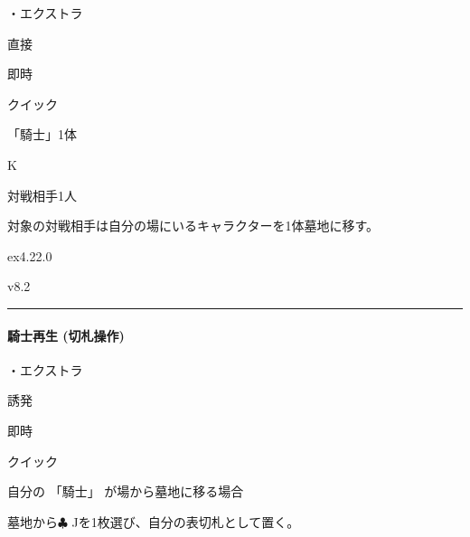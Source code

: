 \documentclass[letterpaper,10pt,dvipdfmx]{sphinxmanual}
\begin{document}
\sphinxAtStartPar
・エクストラ

\sphinxAtStartPar
{} 直接

\sphinxAtStartPar
{} 即時

\sphinxAtStartPar
{} クイック

\sphinxAtStartPar
{} 「騎士」1体

\sphinxAtStartPar
{} K

\sphinxAtStartPar
{}

\sphinxAtStartPar
対戦相手1人

\sphinxAtStartPar
{}

\sphinxAtStartPar
対象の対戦相手は自分の場にいるキャラクターを1体墓地に移す。

\sphinxAtStartPar
{}  ex4.22.0

\sphinxAtStartPar
{}  v8.2


\bigskip\hrule\bigskip



\paragraph{騎士再生 (切札操作)}
\label{\detokenize{auto/frameActionlist:act-knightrevive}}\label{\detokenize{auto/frameActionlist:id84}}
\sphinxAtStartPar
{}

\sphinxAtStartPar
・エクストラ

\sphinxAtStartPar
{} 誘発

\sphinxAtStartPar
{} 即時

\sphinxAtStartPar
{} クイック

\sphinxAtStartPar
{}

\sphinxAtStartPar
自分の 「騎士」 が場から墓地に移る場合

\sphinxAtStartPar
{}

\sphinxAtStartPar
墓地から{\normalsize $\clubsuit$} Jを1枚選び、自分の表切札として置く。
\end{document}
